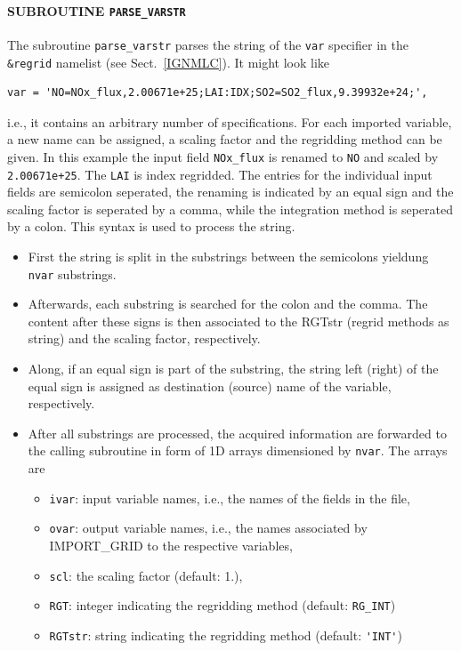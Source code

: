 \documentclass[11pt,twoside]{report}
\begin{document}
\paragraph{SUBROUTINE \color{blue} \tt\bf PARSE\_VARSTR\\ \label{IGPARSEVARSTR}}
The subroutine \verb|parse_varstr| parses the string of
the \verb|var| specifier in the \verb|&regrid| namelist (see
Sect.~\ref{IGNMLC}).
It might look like
\begin{verbatim}
var = 'NO=NOx_flux,2.00671e+25;LAI:IDX;SO2=SO2_flux,9.39932e+24;',
\end{verbatim}
i.e., it contains an arbitrary number of specifications. For each
imported variable, a new name can be assigned, a scaling factor and the
regridding method can be given.
In this example the input field \verb|NOx_flux| is renamed to \verb|NO| and
scaled by \verb|2.00671e+25|. The \verb|LAI| is index
regridded. The entries for the individual input
fields are semicolon seperated, the renaming is indicated by an equal
sign and the scaling factor is seperated by a comma, while the
integration method is seperated by a colon. This syntax is
used to process the string. 
\begin{itemize}
\item First the string is split in
the substrings between the semicolons yieldung \verb|nvar| substrings.
\item Afterwards, each substring is searched
for the colon and the comma. The content after these signs is then
associated to the RGTstr (regrid methods as string) and the scaling
factor, respectively. 
\item Along, if an equal sign is part of the
substring, the string left (right) of the equal sign is assigned as destination
 (source) name of the variable, respectively. 
\item After all substrings are processed,
 the acquired information are forwarded to the calling subroutine in
 form of 1D arrays dimensioned by \verb|nvar|.
The arrays are
\begin{itemize}
\item \verb|ivar|: input variable names, i.e., the names of the fields
 in the file,
\item \verb|ovar|: output variable names, i.e., the names associated by
IMPORT\_GRID to the respective variables,
\item \verb|scl|: the scaling factor (default: 1.),
\item \verb|RGT|: integer indicating the regridding method (default: \verb|RG_INT|)
\item \verb|RGTstr|: string indicating the regridding method (default: \verb|'INT'|)
\end{itemize}
\end{itemize}
\end{document}
